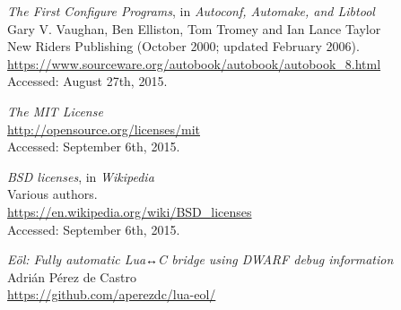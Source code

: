 \begin{thebibliography}{99}
		\emph{The First Configure Programs},
		in \emph{Autoconf, Automake, and Libtool} \\
		Gary V. Vaughan, Ben Elliston, Tom Tromey and Ian Lance Taylor \\
		New Riders Publishing (October 2000; updated February 2006). \\
		\url{https://www.sourceware.org/autobook/autobook/autobook_8.html} \\
		Accessed: August 27th, 2015.

		\emph{The MIT License} \\
		\url{http://opensource.org/licenses/mit} \\
		Accessed: September 6th, 2015.

		\emph{BSD licenses}, in \emph{Wikipedia} \\
		Various authors. \\
		\url{https://en.wikipedia.org/wiki/BSD_licenses} \\
		Accessed: September 6th, 2015.

		\emph{Eöl: Fully automatic Lua↔C bridge using DWARF debug information} \\
		Adrián Pérez de Castro \\
		\url{https://github.com/aperezdc/lua-eol/}

\end{thebibliography}


